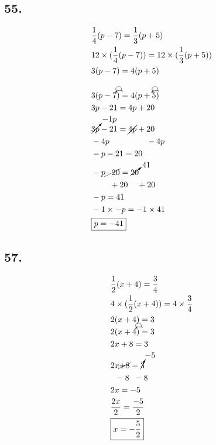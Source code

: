 \documentclass{article}
\newcommand{\tikzmark}[1]{\tikz[overlay,remember picture] \node (#1) {};}
\newcommand{\DrawBox}[2]{%
    \begin{tikzpicture}[overlay,remember picture]
        \draw[->,shorten >=5pt,shorten <=5pt,out=70,in=130,distance=0.5cm,#1] (MarkA.north) to (MarkC.north);
        \draw[->,shorten >=5pt,shorten <=5pt,out=50,in=140,distance=0.3cm,#2] (MarkA.north) to (MarkB.north);
    \end{tikzpicture}
}
\begin{document}
    \subsection*{55.}
    \begin{align*}
        & \frac{1}{4}(p - 7) = \frac{1}{3}(p + 5)\\
        & 12 \times (\frac{1}{4}(p - 7)) = 12 \times (\frac{1}{3}(p + 5))\\
        & 3(p - 7) = 4(p + 5) \\
        & \\
        & \tikzmark{MarkA}3(p\tikzmark{MarkB} - 7\tikzmark{MarkC})\DrawBox{black}{black} = \tikzmark{MarkA}4(p\tikzmark{MarkB} + 5\tikzmark{MarkC}\DrawBox{black}{black}) \\
        & 3p - 21 = 4p + 20 \\
        & \cancelto{-1p}{3p} - 21 = \cancel{4p} + 20 \\
        & -4p \hspace{1.6cm} -4p\\
        & -p - 21 = 20\\
        & -p \cancel{- 20} = \cancelto{41}{20}\\
        & \hspace{.8cm}+ 20 \hspace{.4cm}+20 \\
        & -p = 41\\
        & -1 \times -p  = -1 \times 41\\
        & \boxed{p = -41}
    \end{align*}

    \subsection*{57.}
    \begin{align*}
        & \frac{1}{2}(x + 4) = \frac{3}{4}\\
        & 4 \times(\frac{1}{2}(x + 4)) = 4 \times \frac{3}{4}\\
        & 2(x + 4) = 3\\
        & \tikzmark{MarkA}2(x\tikzmark{MarkB} + 4\tikzmark{MarkC})\DrawBox{black}{black} = 3 \\
        & 2x + 8 = 3\\
        & 2x \cancel{+ 8} = \cancelto{-5}{3} \\
        & \hspace{.2cm} - 8\hspace{.2cm} -8\\
        & 2x = -5\\
        & \frac{2x}{2} = \frac{-5}{2} \\
        & \boxed{x = -\frac{5}{2}}\\
    \end{align*}
\end{document}
